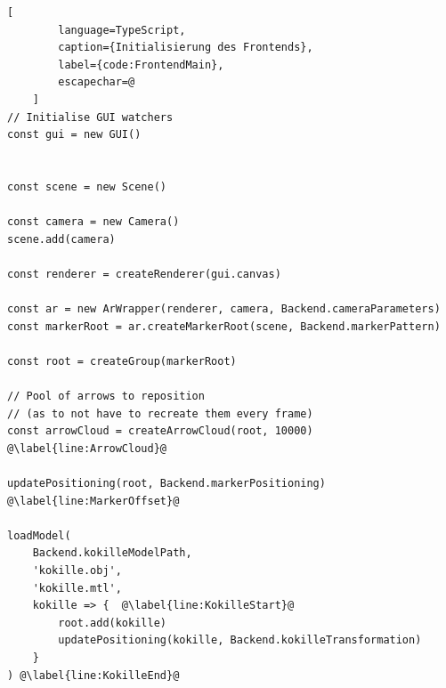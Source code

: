 \begin{codefloat}
	\begin{lstlisting}[
		language=TypeScript,
		caption={Initialisierung des Frontends},
		label={code:FrontendMain},
		escapechar=@
	]
// Initialise GUI watchers
const gui = new GUI()


const scene = new Scene()

const camera = new Camera()
scene.add(camera)

const renderer = createRenderer(gui.canvas)

const ar = new ArWrapper(renderer, camera, Backend.cameraParameters)
const markerRoot = ar.createMarkerRoot(scene, Backend.markerPattern)

const root = createGroup(markerRoot)

// Pool of arrows to reposition
// (as to not have to recreate them every frame)
const arrowCloud = createArrowCloud(root, 10000) @\label{line:ArrowCloud}@

updatePositioning(root, Backend.markerPositioning) @\label{line:MarkerOffset}@

loadModel(
	Backend.kokilleModelPath,
	'kokille.obj',
	'kokille.mtl',
	kokille => {  @\label{line:KokilleStart}@
		root.add(kokille)
		updatePositioning(kokille, Backend.kokilleTransformation)
	}
) @\label{line:KokilleEnd}@
	\end{lstlisting}
\end{codefloat}

